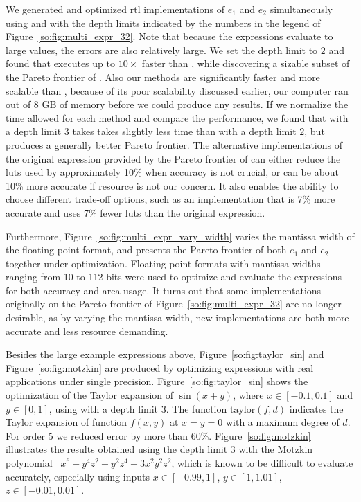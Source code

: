 We generated and optimized \gls{rtl} implementations of $e_1$ and
$e_2$ simultaneously using \frontiertrace{} and \greedytrace{}
with the depth limits indicated by the numbers in the legend of
Figure~\ref{so:fig:multi_expr_32}. Note that because the expressions evaluate
to large values, the errors are also relatively large. We set the depth limit
to $2$ and found that \greedytrace{} executes up to $10\times$ faster than
\frontiertrace{}, while discovering a sizable subset of the Pareto frontier of
\frontiertrace{}. Also our methods are significantly faster and more scalable
than \marteltrace{}, because of its poor scalability discussed earlier, our
computer ran out of 8 GB of memory before we could produce any results. If we
normalize the time allowed for each method and compare the performance, we
found that \greedytrace{} with a depth limit $3$ takes takes slightly less time
than \frontiertrace{} with a depth limit $2$, but produces a generally better
Pareto frontier. The alternative implementations of the original expression
provided by the Pareto frontier of \greedytrace{} can either reduce the
\glspl{lut} used by approximately 10\% when accuracy is not crucial, or can
be about 10\% more accurate if resource is not our concern.  It also enables
the ability to choose different trade-off options, such as an implementation
that is 7\% more accurate and uses 7\% fewer \glspl{lut} than the original
expression.

Furthermore, Figure~\ref{so:fig:multi_expr_vary_width} varies the mantissa
width of the floating-point format, and presents the Pareto frontier
of both $e_1$ and $e_2$ together under optimization. Floating-point
formats with mantissa widths ranging from 10 to 112 bits were used to
optimize and evaluate the expressions for both accuracy and area usage. It
turns out that some implementations originally on the Pareto frontier of
Figure~\ref{so:fig:multi_expr_32} are no longer desirable, as by varying the
mantissa width, new implementations are both more accurate and less resource
demanding.

Besides the large example expressions above, Figure~\ref{so:fig:taylor_sin}
and Figure~\ref{so:fig:motzkin} are produced by optimizing expressions with
real applications under single precision. Figure~\ref{so:fig:taylor_sin} shows
the optimization of the Taylor expansion of $\sin(x + y)$, where $x\in[-0.1,
0.1]$ and $y\in[0, 1]$, using \greedytrace{} with a depth limit $3$. The
function $\mathrm{taylor}(f, d)$ indicates the Taylor expansion of function
$f(x, y)$ at $x = y = 0$ with a maximum degree of $d$. For order 5 we reduced
error by more than 60\%. Figure~\ref{so:fig:motzkin} illustrates the results
obtained using the depth limit $3$ with the Motzkin polynomial~\cite{demmel}
$x^6 + y^4 z^2 + y^2 z^4 - 3 x^2 y^2 z^2$, which is known to be difficult to
evaluate accurately, especially using inputs $x\in[-0.99, 1]$, $y\in[1, 1.01]$,
$z\in[-0.01, 0.01]$.

